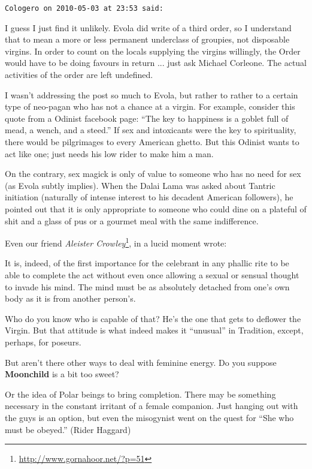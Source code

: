 \begin{footnotesize}
\begin{sffamily}
\hfill

\texttt{Cologero on 2010-05-03 at 23:53 said:}

I guess I just find it unlikely. Evola did write of a third order, so I understand that to mean a more or less permanent underclass of groupies, not disposable virgins. In order to count on the locals supplying the virgins willingly, the Order would have to be doing favours in return ... just ask Michael Corleone. The actual activities of the order are left undefined.

I wasn't addressing the post so much to Evola, but rather to rather to a certain type of neo-pagan who has not a chance at a virgin. For example, consider this quote from a Odinist facebook page: ``The key to happiness is a goblet full of mead, a wench, and a steed.'' If sex and intoxicants were the key to spirituality, there would be pilgrimages to every American ghetto. But this Odinist wants to act like one; just needs his low rider to make him a man.

On the contrary, sex magick is only of value to someone who has no need for sex (as Evola subtly implies). When the Dalai Lama was asked about Tantric initiation (naturally of intense interest to his decadent American followers), he pointed out that it is only appropriate to someone who could dine on a plateful of shit and a glass of pus or a gourmet meal with the same indifference.

Even our friend \textit{Aleister Crowley}\footnote{\url{http://www.gornahoor.net/?p=51}}, in a lucid moment wrote:

\begin{quotex}\footnotesize

It is, indeed, of the first importance for the celebrant in any phallic rite to be able to complete the act without even once allowing a sexual or sensual thought to invade his mind. The mind must be as absolutely detached from one's own body as it is from another person's.
\end{quotex}


Who do you know who is capable of that? He's the one that gets to deflower the Virgin. But that attitude is what indeed makes it ``unusual'' in Tradition, except, perhaps, for poseurs.

But aren't there other ways to deal with feminine energy. Do you suppose \textbf{Moonchild} is a bit too sweet?


Or the idea of Polar beings to bring completion. There may be something necessary in the constant irritant of a female companion. Just hanging out with the guys is an option, but even the misogynist went on the quest for ``She who must be obeyed.'' (Rider Haggard)


\end{sffamily}
\end{footnotesize}
